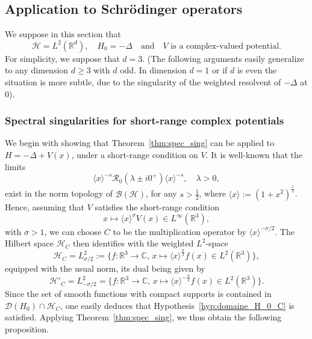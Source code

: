 \documentclass[10pt]{amsart}
\theoremstyle{definition}\newtheorem{defi}[theo]{Definition}\newtheorem{rema}[theo]{Remark}\newtheorem{exam}[theo]{Example}\newtheorem{exem}[theo]{Example}\newtheorem{nota}[theo]{Notation}
\newcommand{\Hi}{\mathcal{H}}
\newcommand{\bbC}{\mathbb{C}}
\newcommand{\R}{\mathbb{R}}
\newcommand{\Res}{\mathcal{R}}
\newcommand{\clB}{\mathcal{B}}
\newcommand{\clD}{\mathcal{D}}
\begin{document}
\subsection{Application to Schr\"odinger operators}\label{subsec:appli}
We suppose in this section that
\begin{equation*}
\Hi=L^2(\R^d), \quad H_0=-\Delta \quad\text{and}\quad V\text{ is a complex-valued potential.}
\end{equation*}
For simplicity, we suppose that $d=3$. (The following arguments easily generalize to any dimension $d\ge3$ with $d$ odd. In dimension $d=1$ or if $d$ is even the situation is more subtle, due to the singularity of the weighted resolvent of $-\Delta$ at $0$).

\subsubsection{Spectral singularities for short-range complex potentials}
We begin with showing that Theorem~\ref{thm:spec_sing} can be applied to $H=-\Delta+V(x)$, under a short-range condition on $V$. It is well-known that the limits
\begin{equation}\label{eq:LAP-Delta}
\langle x\rangle^{-s}\Res_0(\lambda\pm i0^+)\langle x\rangle^{-s}, \quad \lambda >0,
\end{equation}
exist in the norm topology of $\clB(\Hi)$, for any $s>\frac12$, where $\langle x\rangle:=(1+x^2)^{\frac12}$. Hence, assuming that $V$ satisfies the short-range condition
\begin{equation}\label{eq:short-range}
x\mapsto \langle x\rangle^{\sigma}V(x) \in L^\infty(\R^3),
\end{equation}
with $\sigma>1$, we can choose $C$ to be the multiplication operator by $\langle x\rangle^{-\sigma/2}$. The Hilbert space $\Hi_C$ then identifies with the weighted $L^2$-space
\begin{equation*}
\Hi_C=L^2_{\sigma/2}:=\big\{f :\R^3\to\bbC, \, x\mapsto \langle x\rangle^{\frac{\sigma}{2}}f(x) \in L^2(\R^3) \big \},
\end{equation*}
equipped with the usual norm, its dual being given by
\begin{equation*}
\Hi'_C=L^2_{-\sigma/2}=\big\{f :\R^3\to\bbC, \, x\mapsto \langle x\rangle^{-\frac{\sigma}{2}}f(x) \in L^2(\R^3) \big \}.
\end{equation*}
Since the set of smooth functions with compact supports is contained in $\clD(H_0)\cap \Hi_C$, one easily deduces that Hypothesis~\ref{hyp:domaine_H_0_C} is satisfied. Applying Theorem~\ref{thm:spec_sing}, we thus obtain the following proposition.
\end{document}
